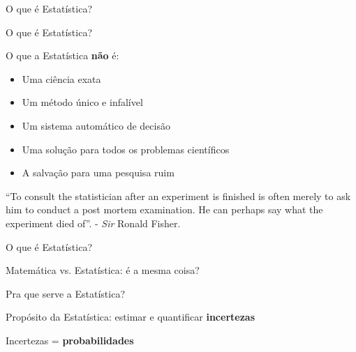 \documentclass{beamer}\usepackage[]{graphicx}\usepackage[]{color}
\begin{document}
\begin{frame}{O que é Estatística?}

O que é Estatística? \pause

\vfill

  O que a Estatística \textbf{não} é: 

  \begin{itemize}
  
    \item{Uma ciência exata}
    
    \item{Um método único e infalível}
    
    \item{Um sistema automático de decisão}
    
    \item{Uma solução para todos os problemas científicos}
    
    \item{A salvação para uma pesquisa ruim}
    
   \end{itemize}
    
\scriptsize{``To consult the statistician after an experiment is finished is often merely to ask him to conduct a post mortem examination. He can perhaps say what the experiment died of''. - \emph{Sir} Ronald Fisher.}

\end{frame}


\begin{frame}{O que é Estatística?}

  Matemática vs. Estatística: é a mesma coisa?
  \pause
  
  \vfill
  
  Pra que serve a Estatística? \pause
  \vfill

  Propósito da Estatística: estimar e quantificar \textbf{incertezas}
  
  \vfill
  
  Incertezas = \textbf{probabilidades}

\end{frame}
\end{document}
